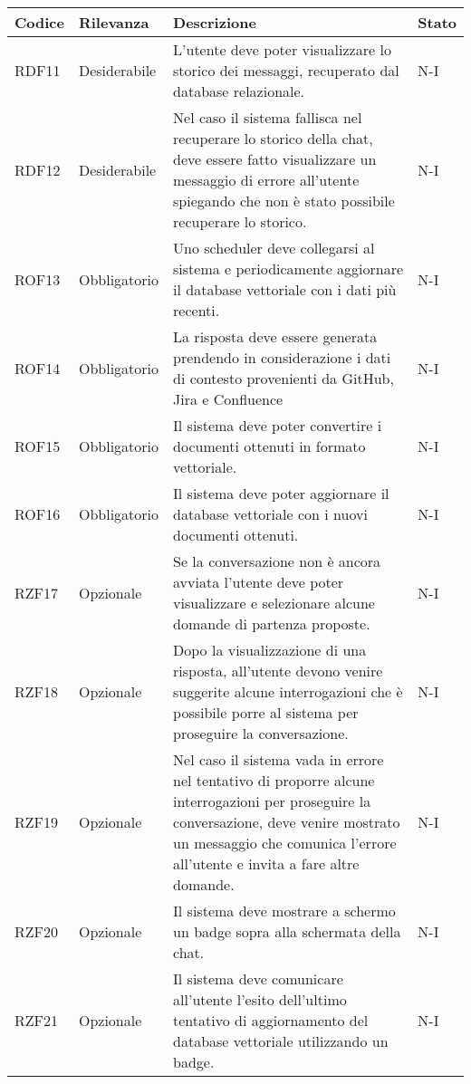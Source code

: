 \begin{table}[h!]
\begin{tabularx}{\textwidth}{|p{2cm}|p{3cm}|X|p{4cm}|}
    \end{tabularx}
\end{table}

\vspace{0.5cm}
\newpage
\begin{table}[h!]
    \renewcommand{\arraystretch}{1.6} %
    \begin{tabularx}{\textwidth}{|p{2cm}|p{3cm}|X|p{4cm}|} \hline
    \rowcolor[HTML]{FFD700} 
    \textbf{Codice} & \textbf{Rilevanza} & \textbf{Descrizione} & \textbf{Stato} \\ \hline
    RDF11 & Desiderabile & L'utente deve poter visualizzare lo storico dei messaggi, recuperato dal database relazionale. & N-I \\ \hline
    RDF12 & Desiderabile & Nel caso il sistema fallisca nel recuperare lo storico della chat, deve essere fatto visualizzare un messaggio di errore all'utente spiegando che non è stato possibile recuperare lo storico. & N-I \\ \hline
    ROF13 & Obbligatorio & Uno scheduler deve collegarsi al sistema e periodicamente aggiornare il database vettoriale con i dati più recenti. & N-I \\ \hline
    ROF14 & Obbligatorio & La risposta deve essere generata prendendo in considerazione i dati di contesto provenienti da GitHub, Jira e Confluence & N-I \\ \hline
    ROF15 & Obbligatorio & Il sistema deve poter convertire i documenti ottenuti in formato vettoriale. & N-I \\ \hline
    ROF16 & Obbligatorio & Il sistema deve poter aggiornare il database vettoriale con i nuovi documenti ottenuti. & N-I \\ \hline
    RZF17 & Opzionale & Se la conversazione non è ancora avviata l'utente deve poter visualizzare e selezionare alcune domande di partenza proposte. & N-I \\ \hline
    RZF18 & Opzionale & Dopo la visualizzazione di una risposta, all'utente devono venire suggerite alcune interrogazioni che è possibile porre al sistema per proseguire la conversazione. & N-I \\ \hline
    RZF19 & Opzionale & Nel caso il sistema vada in errore nel tentativo di proporre alcune interrogazioni per proseguire la conversazione, deve venire mostrato un messaggio che comunica l'errore all'utente e invita a fare altre domande. & N-I \\ \hline
    RZF20 & Opzionale & Il sistema deve mostrare a schermo un badge sopra alla schermata della chat. & N-I \\ \hline
    RZF21 & Opzionale & Il sistema deve comunicare all'utente l'esito dell'ultimo tentativo di aggiornamento del database vettoriale utilizzando un badge. & N-I \\ \hline

    \end{tabularx}
\end{table}

